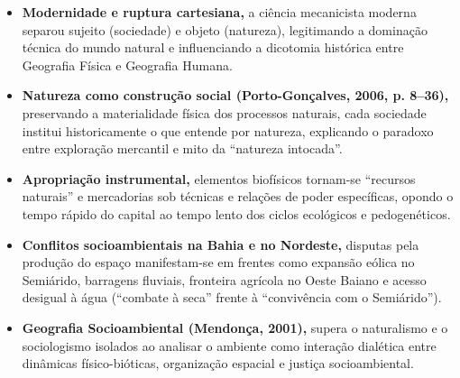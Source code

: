 \begin{boxResumo}
\begin{itemize}[leftmargin=1.5em, itemsep=3pt]
  \item \textbf{Modernidade e ruptura cartesiana,} a ciência mecanicista moderna separou sujeito (sociedade) e objeto (natureza), legitimando a dominação técnica do mundo natural e influenciando a dicotomia histórica entre Geografia Física e Geografia Humana.
  \item \textbf{Natureza como construção social (Porto-Gonçalves, 2006, p. 8--36),} preservando a materialidade física dos processos naturais, cada sociedade institui historicamente o que entende por natureza, explicando o paradoxo entre exploração mercantil e mito da ``natureza intocada''.
  \item \textbf{Apropriação instrumental,} elementos biofísicos tornam-se ``recursos naturais'' e mercadorias sob técnicas e relações de poder específicas, opondo o tempo rápido do capital ao tempo lento dos ciclos ecológicos e pedogenéticos.
  \item \textbf{Conflitos socioambientais na Bahia e no Nordeste,} disputas pela produção do espaço manifestam-se em frentes como expansão eólica no Semiárido, barragens fluviais, fronteira agrícola no Oeste Baiano e acesso desigual à água (``combate à seca'' frente à ``convivência com o Semiárido'').
  \item \textbf{Geografia Socioambiental (Mendonça, 2001),} supera o naturalismo e o sociologismo isolados ao analisar o ambiente como interação dialética entre dinâmicas físico-bióticas, organização espacial e justiça socioambiental.
\end{itemize}
\end{boxResumo}

